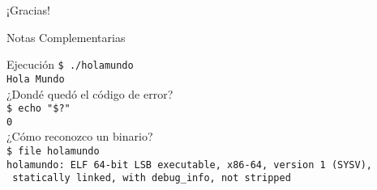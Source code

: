 \documentclass[aspectratio=169]{beamer}
\begin{document}

\begin{frame}[plain]
    \begin{center}
    \vspace{2cm}
    \huge ¡Gracias!\\
    \vspace{2cm}
    \end{center}
\end{frame}

\begin{frame}[plain]
    \begin{center}
    \vspace{2cm}
    \huge Notas Complementarias\\
    \vspace{2cm}
    \end{center}
\end{frame}

\begin{frame}[fragile,t]{Ejecución}
    \small
    \vspace{0.2cm}
        \verb|$ ./holamundo|\\
        \pause
        \vspace{0.2cm}
        \verb|Hola Mundo|\\
        \pause
    \vspace{0.7cm}
        \textcolor{verdeuca}{¿Dondé quedó el código de error?}\\
        \pause
        \vspace{0.2cm}
        \verb|$ echo "$?"|\\
        \pause
        \vspace{0.2cm}
        \verb|0|\\
        \pause
    \vspace{0.7cm}
        \textcolor{verdeuca}{¿Cómo reconozco un binario?}\\
        \pause
        \vspace{0.2cm}
        \verb|$ file holamundo|\\
        \pause
        \vspace{0.2cm}
        \verb|holamundo: ELF 64-bit LSB executable, x86-64, version 1 (SYSV),|\\
        \verb| statically linked, with debug_info, not stripped|\\
\end{frame}
\end{document}
